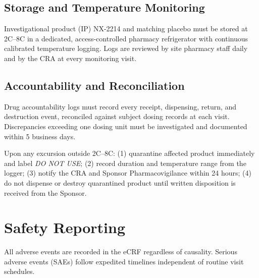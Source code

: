 \documentclass[11pt,a4paper]{scrreprt}
\begin{document}
\subsection{Storage and Temperature Monitoring}

Investigational product (IP) NX-2214 and matching placebo must be stored at
2\textdegree C--8\textdegree C in a dedicated, access-controlled pharmacy refrigerator with
continuous calibrated temperature logging. Logs are reviewed by site pharmacy staff daily and
by the CRA at every monitoring visit.

\subsection{Accountability and Reconciliation}

Drug accountability logs must record every receipt, dispensing, return, and destruction event,
reconciled against subject dosing records at each visit. Discrepancies exceeding one dosing
unit must be investigated and documented within 5 business days.

\begin{tcolorbox}[colback=sopamber!8!white, colframe=sopamber, boxrule=0.8pt, arc=2pt,
  left=8pt, right=8pt, top=6pt, bottom=6pt,
  title={\faExclamationTriangle\ \ Temperature Excursion Handling}, coltitle=white,
  colbacktitle=sopamber, fonttitle=\bfseries\small]
\small
Upon any excursion outside 2\textdegree C--8\textdegree C: (1) quarantine affected product
immediately and label \emph{DO NOT USE}; (2) record duration and temperature range from the
logger; (3) notify the CRA and Sponsor Pharmacovigilance within 24 hours; (4) do not dispense
or destroy quarantined product until written disposition is received from the Sponsor.
\end{tcolorbox}

\section{Safety Reporting}

All adverse events are recorded in the eCRF regardless of causality. Serious adverse events
(SAEs) follow expedited timelines independent of routine visit schedules.
\end{document}
